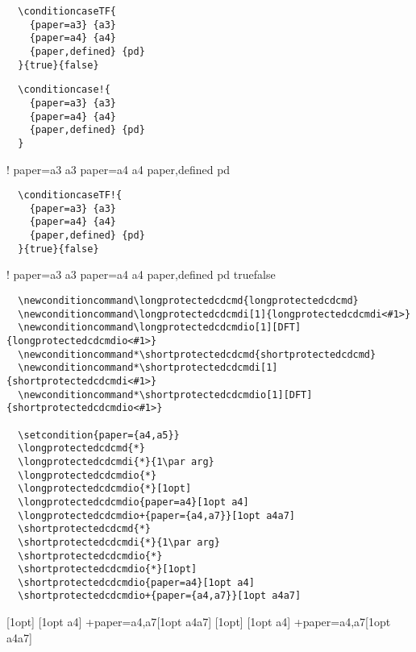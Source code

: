 {\color{red!90!black}
\begin{verbatim}
  \conditioncaseTF{
    {paper=a3} {a3}
    {paper=a4} {a4}
    {paper,defined} {pd}
  }{true}{false}
\end{verbatim}
}

{\color{red!90!black}
\begin{verbatim}
  \conditioncase!{
    {paper=a3} {a3}
    {paper=a4} {a4}
    {paper,defined} {pd}
  }
\end{verbatim}
}
\conditioncase!{
  {paper=a3} {a3}
  {paper=a4} {a4}
  {paper,defined} {pd}
}

{\color{red!90!black}
\begin{verbatim}
  \conditioncaseTF!{
    {paper=a3} {a3}
    {paper=a4} {a4}
    {paper,defined} {pd}
  }{true}{false}
\end{verbatim}
}
\conditioncaseTF!{
  {paper=a3} {a3}
  {paper=a4} {a4}
  {paper,defined} {pd}
}{true}{false}

{\color{red!90!black}
\begin{verbatim}
  \newconditioncommand\longprotectedcdcmd{longprotectedcdcmd}
  \newconditioncommand\longprotectedcdcmdi[1]{longprotectedcdcmdi<#1>}
  \newconditioncommand\longprotectedcdcmdio[1][DFT]{longprotectedcdcmdio<#1>}
  \newconditioncommand*\shortprotectedcdcmd{shortprotectedcdcmd}
  \newconditioncommand*\shortprotectedcdcmdi[1]{shortprotectedcdcmdi<#1>}
  \newconditioncommand*\shortprotectedcdcmdio[1][DFT]{shortprotectedcdcmdio<#1>}

  \setcondition{paper={a4,a5}}
  \longprotectedcdcmd{*}
  \longprotectedcdcmdi{*}{1\par arg}
  \longprotectedcdcmdio{*}
  \longprotectedcdcmdio{*}[1opt]
  \longprotectedcdcmdio{paper=a4}[1opt a4]
  \longprotectedcdcmdio+{paper={a4,a7}}[1opt a4a7]
  \shortprotectedcdcmd{*}
  \shortprotectedcdcmdi{*}{1\par arg}
  \shortprotectedcdcmdio{*}
  \shortprotectedcdcmdio{*}[1opt]
  \shortprotectedcdcmdio{paper=a4}[1opt a4]
  \shortprotectedcdcmdio+{paper={a4,a7}}[1opt a4a7]
\end{verbatim}
}
\newconditioncommand{}
\newconditioncommand{}
\newconditioncommand{}
\newconditioncommand*{}
\newconditioncommand*{}
\newconditioncommand*{}

{\ttfamily{}\obeylines
\longprotectedcdcmd{*}
\longprotectedcdcmdio{*}
\longprotectedcdcmdio{*}[1opt]
[1opt a4]
\longprotectedcdcmdio+{paper={a4,a7}}[1opt a4a7]
\shortprotectedcdcmd{*}
\shortprotectedcdcmdio{*}
\shortprotectedcdcmdio{*}[1opt]
[1opt a4]
\shortprotectedcdcmdio+{paper={a4,a7}}[1opt a4a7]
}
